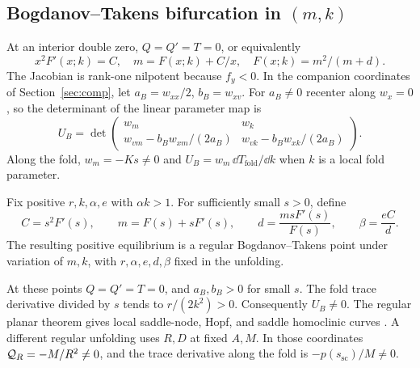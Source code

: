 \subsection{Bogdanov--Takens bifurcation in \texorpdfstring{\((m,k)\)}{(m,k)}}
At an interior double zero, \(Q=Q'=T=0\), or equivalently
\[
 x^2F'(x;k)=C,\quad m=F(x;k)+C/x,\quad F(x;k)=m^2/(m+d).
\]
The Jacobian is rank-one nilpotent because \(f_y<0\). In the companion coordinates of Section~\ref{sec:comp}, let \(a_B=w_{xx}/2\), \(b_B=w_{xv}\). For \(a_B\ne0\) recenter along \(w_x=0\), so the determinant of the linear parameter map is
\begin{equation}\label{eq:U}
 U_B=\det\begin{pmatrix}
 w_m&w_k\\
 w_{vm}-b_Bw_{xm}/(2a_B)&w_{vk}-b_Bw_{xk}/(2a_B)
 \end{pmatrix}.
\end{equation}
Along the fold, \(w_m=-Ks\ne0\) and \(U_B=w_m\,\dd T_{\mathrm{fold}}/\dd k\) when \(k\) is a local fold parameter.
\begin{theorem}\label{thm:bt}
Fix positive \(r,k,\alpha,e\) with \(\alpha k>1\). For sufficiently small \(s>0\), define
\begin{equation}\label{eq:btfamily}
 C=s^2F'(s),\qquad m=F(s)+sF'(s),\qquad
 d=\frac{msF'(s)}{F(s)},\qquad \beta=\frac{eC}{d}.
\end{equation}
The resulting positive equilibrium is a regular Bogdanov--Takens point under variation of \(m,k\), with \(r,\alpha,e,d,\beta\) fixed in the unfolding.
\end{theorem}
At these points \(Q=Q'=T=0\), and \(a_B,b_B>0\) for small \(s\). The fold trace derivative divided by \(s\) tends to \(r/(2k^2)>0\). Consequently \(U_B\ne0\). The regular planar theorem gives local saddle-node, Hopf, and saddle homoclinic curves \citep{kuznetsov98}. A different regular unfolding uses \(R,D\) at fixed \(A,M\). In those coordinates \(\mathcal Q_R=-M/R^2\ne0\), and the trace derivative along the fold is \(-p(s_{\mathrm{sc}})/M\ne0\).

